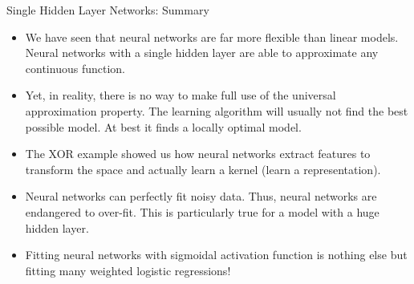 \begin{vbframe}{Single Hidden Layer Networks: Summary}
  \begin{itemize}
    \item We have seen that neural networks are far more flexible than linear models. Neural networks with a single hidden layer are able to approximate any continuous function.
    \item Yet, in reality, there is no way to make full use of the universal approximation property. The learning algorithm will usually not find the best possible model. At best it finds a locally optimal model. 
    \item The XOR example showed us how neural networks extract features to transform the space and actually learn a kernel (learn a representation).
    \item Neural networks can perfectly fit noisy data. Thus, neural networks are endangered to over-fit. This is particularly true for a model with a huge hidden layer.
    \item Fitting neural networks with sigmoidal activation function is nothing else but fitting many weighted logistic regressions!
  \end{itemize}
\end{vbframe}

